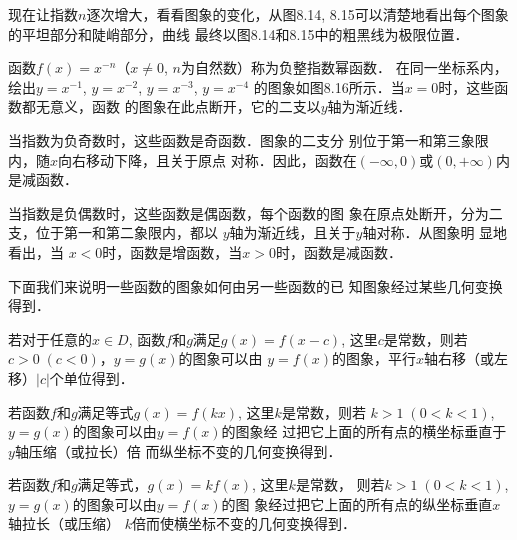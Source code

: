 现在让指数$n$逐次增大，看看图象的变化，从图8.14,
8.15可以清楚地看出每个图象的平坦部分和陡峭部分，曲线
最终以图8.14和8.15中的粗黑线为极限位置．

函数$f(x)=x^{-n}$（$x\ne 0$, $n$为自然数）称为负整指数幂函数．
在同一坐标系内，绘出$y=x^{-1}$, $y=x^{-2}$, $y=x^{-3}$, $y=x^{-4}$
的图象如图8.16所示．当$x=0$时，这些函数都无意义，函数
的图象在此点断开，它的二支以$y$轴为渐近线．

当指数为负奇数时，这些函数是奇函数．图象的二支分
别位于第一和第三象限内，随$x$向右移动下降，且关于原点
对称．因此，函数在$(-\infty,0)$或$(0,+\infty)$内是减函数．

当指数是负偶数时，这些函数是偶函数，每个函数的图
象在原点处断开，分为二支，位于第一和第二象限内，都以
$y$轴为渐近线，且关于$y$轴对称．从图象明 显地看出，当
$x<0$时，函数是增函数，当$x>0$时，函数是减函数．

下面我们来说明一些函数的图象如何由另一些函数的已
知图象经过某些几何变换得到．

若对于任意的$x\in D$, 函数$f$和$g$满足$g(x)=f(x-c)$,
这里$c$是常数，则若$c>0\; (c<0)$，$y=g(x)$的图象可以由
$y=f(x)$的图象，平行$x$轴右移（或左移）$|c|$个单位得到．

若函数$f$和$g$满足等式$g(x)=f(kx)$, 这里$k$是常数，则若
$k>1\; (0<k<1)$, $y=g(x)$的图象可以由$y=f(x)$的图象经
过把它上面的所有点的横坐标垂直于$y$轴压缩（或拉长）倍
而纵坐标不变的几何变换得到．

若函数$f$和$g$满足等式，$g(x)=kf(x)$, 这里$k$是常数，
则若$k>1\; (0<k<1)$, $y=g(x)$的图象可以由$y=f(x)$的图
象经过把它上面的所有点的纵坐标垂直$x$轴拉长（或压缩）
$k$倍而使横坐标不变的几何变换得到．

